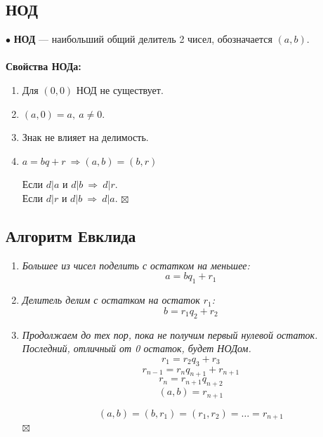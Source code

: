 \documentclass[a4paper, 12pt]{article}
\newenvironment{Proof}
{\par\noindent{$\blacklozenge$}}
{\hfill$\scriptstyle\boxtimes$}
\begin{document}
    \subsection{НОД}
    $\bullet$ \textbf{НОД} --- наибольший общий делитель 2 чисел, обозначается $(a, b)$.\\\\
    \textbf{Свойства НОДа:}
    \begin{enumerate}
        \item Для $(0, 0)$ НОД не существует.
        \item $(a, 0) = a, \ a \neq 0$.
        \item Знак не влияет на делимость.
        \item $a=bq+r \ \Rightarrow (a,b)=(b,r)$
        \begin{Proof}
        Если $d|a$ и $d|b \ \Rightarrow \ d|r$.\\
        Если $d|r$ и $d|b \ \Rightarrow \ d|a$.
        \end{Proof}
    \end{enumerate}
    \subsection{Алгоритм Евклида}
    \begin{enumerate}
        \item \textit{Большее из чисел поделить с остатком на меньшее:}
        $$a=bq_1+r_1$$
        \item \textit{Делитель делим с остатком на остаток $r_1$:}
        $$b=r_1q_2+r_2$$
        \item \textit{Продолжаем до тех пор, пока не получим первый нулевой остаток. Последний, отличный от 0 остаток, будет НОДом.}
        $$r_1=r_2q_3+r_3$$
        $$r_{n-1}=r_nq_{n+1}+r_{n+1}$$
        $$r_n=r_{n+1}q_{n+2}$$
        $$(a,b)=r_{n+1}$$
        \begin{Proof}
        $$(a,b)=(b,r_1)=(r_1,r_2)=\dots=r_{n+1}$$
        \end{Proof}
    \end{enumerate}
\end{document}
